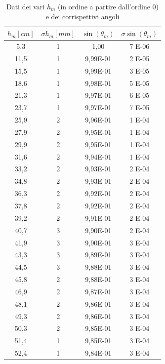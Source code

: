 \documentclass[10pt, a4paper, italian]{article}
\begin{document}
\begin{table}[]
\centering
\begin{tabular}{cc|cc}
\toprule
$h_m [cm]$ & $\sigma h_m [mm]$ & $\sin(\theta _m)$ & $\sigma \sin(\theta _m)$\\
\midrule
5,3 & 1 & 1,00 & 7 E-06 \\
11,5 & 1 & 9,99E-01 & 2 E-05 \\
15,5 & 1 & 9,99E-01 & 3 E-05 \\
18,6 & 1 & 9,98E-01 & 5 E-05 \\
21,3 & 1 & 9,97E-01 & 6 E-05 \\
23,7 & 1 & 9,97E-01 & 7 E-05 \\
25,9 & 2 & 9,96E-01 & 1 E-04 \\
27,9 & 2 & 9,95E-01 & 1 E-04 \\
29,9 & 2 & 9,95E-01 & 1 E-04 \\
31,6 & 2 & 9,94E-01 & 1 E-04 \\
33,2 & 2 & 9,93E-01 & 2 E-04 \\
34,8 & 2 & 9,93E-01 & 2 E-04 \\
36,3 & 2 & 9,92E-01 & 2 E-04 \\
37,8 & 2 & 9,92E-01 & 2 E-04 \\
39,2 & 2 & 9,91E-01 & 2 E-04 \\
40,7 & 3 & 9,90E-01 & 2 E-04 \\
41,9 & 3 & 9,90E-01 & 3 E-04 \\
43,3 & 3 & 9,89E-01 & 3 E-04 \\
44,5 & 3 & 9,88E-01 & 3 E-04 \\
45,8 & 2 & 9,88E-01 & 3 E-04 \\
46,9 & 2 & 9,87E-01 & 3 E-04 \\
48,1 & 2 & 9,86E-01 & 3 E-04 \\
49,3 & 2 & 9,86E-01 & 3 E-04 \\
50,3 & 2 & 9,85E-01 & 3 E-04 \\
51,4 & 1 & 9,85E-01 & 3 E-04 \\
52,4 & 1 & 9,84E-01 & 3 E-04
\end{tabular}
\caption{Dati dei vari $h_m$ (in ordine a partire dall'ordine 0) e dei corrispettivi angoli \label{hm}}
\end{table}
\end{document}

